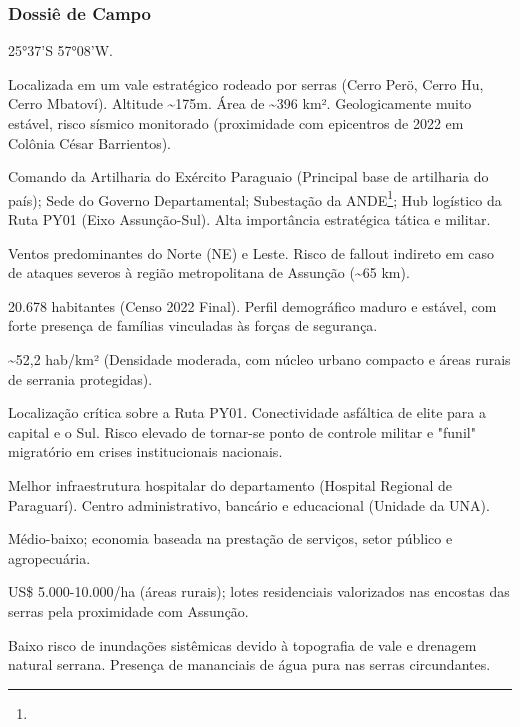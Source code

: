 \subsubsection{Dossiê de Campo}
\begin{description}[style=nextline,leftmargin=0.5cm,font=\bfseries]
\item[Coordenadas]  25°37'S 57°08'W.
\item[Topografia]  Localizada em um vale estratégico rodeado por serras (Cerro Perö, Cerro Hu, Cerro Mbatoví). Altitude \textasciitilde 175m. Área de \textasciitilde 396 km². Geologicamente muito estável, risco sísmico monitorado (proximidade com epicentros de 2022 em Colônia César Barrientos).
\item[Alvos Estratégicos]  Comando da Artilharia do Exército Paraguaio (Principal base de artilharia do país); Sede do Governo Departamental; Subestação da ANDE\footnote{\fineANDE}; Hub logístico da Ruta PY01 (Eixo Assunção-Sul). Alta importância estratégica tática e militar.
\item[Fallout]  Ventos predominantes do Norte (NE) e Leste. Risco de fallout indireto em caso de ataques severos à região metropolitana de Assunção (\textasciitilde 65 km).
\item[População]  20.678 habitantes (Censo 2022 Final). Perfil demográfico maduro e estável, com forte presença de famílias vinculadas às forças de segurança.
\item[Densidade]  \textasciitilde 52,2 hab/\allowbreak km² (Densidade moderada, com núcleo urbano compacto e áreas rurais de serrania protegidas).
\item[Vias de Acesso]  Localização crítica sobre a Ruta PY01. Conectividade asfáltica de elite para a capital e o Sul. Risco elevado de tornar-se ponto de controle militar e "funil" migratório em crises institucionais nacionais.
\item[Serviços]  Melhor infraestrutura hospitalar do departamento (Hospital Regional de Paraguarí). Centro administrativo, bancário e educacional (Unidade da UNA).
\item[Custo de Vida]  Médio-baixo; economia baseada na prestação de serviços, setor público e agropecuária.
\item[Preço da Terra]  US\$ 5.000-10.000/\allowbreak ha (áreas rurais); lotes residenciais valorizados nas encostas das serras pela proximidade com Assunção.
\item[Hidrologia]  Baixo risco de inundações sistêmicas devido à topografia de vale e drenagem natural serrana. Presença de mananciais de água pura nas serras circundantes.

\end{description}
